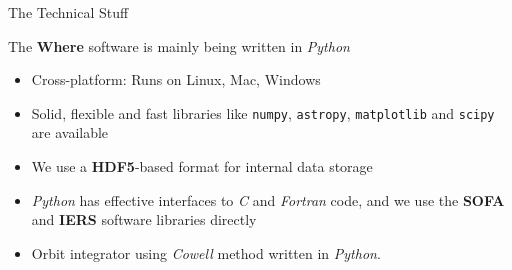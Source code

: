 \documentclass[12pt, english]{beamer}
\begin{document}
\begin{frame}{The Technical Stuff}

The \textbf{Where} software is mainly being written in \emph{Python}

  \begin{itemize}
    \item Cross-platform: Runs on Linux, Mac, Windows
    \item Solid, flexible and fast libraries like \texttt{numpy}, \texttt{astropy}, \texttt{matplotlib} and \texttt{scipy} are available
    \item We use a \textbf{HDF5}-based format for internal data storage
    \item \emph{Python} has effective interfaces to \emph{C} and \emph{Fortran} code, and we use the \textbf{SOFA} and \textbf{IERS} software libraries directly
    \item Orbit integrator using \emph{Cowell} method written in \emph{Python}. 
  \end{itemize}
\end{frame}
\end{document}
